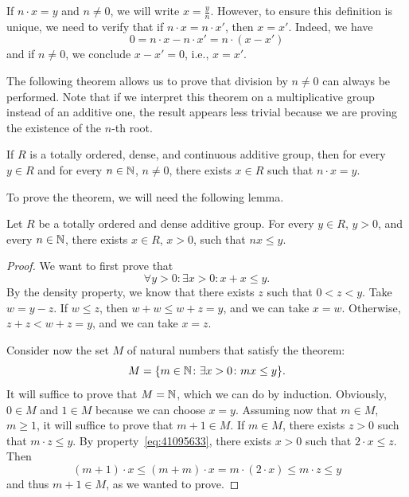 If $n\cdot x = y$ and $n\neq 0$, we will write $x=\frac y n$. However, to ensure
this definition is unique, we need to verify that if $n\cdot x = n\cdot x'$,
then $x=x'$. Indeed, we have
\[
  0 = n\cdot x - n\cdot x' = n\cdot (x-x')
\]
and if $n\neq 0$, we conclude $x-x'=0$, i.e., $x=x'$.

The following theorem allows us to prove that division by $n\neq 0$ can always
be performed. Note that if we interpret this theorem on a multiplicative group
instead of an additive one, the result appears less trivial because we are
proving the existence of the $n$-th root.

\begin{theorem}[Divisibility]
\label{th:divisibile}%
If $R$ is a totally ordered, dense, and continuous additive group, then for
every $y\in R$ and for every $n\in {\mathbb N}$, $n\neq 0$, there exists $x\in R$ such
that $n\cdot x = y$.
\end{theorem}
%
To prove the theorem, we will need the following lemma.
%
\begin{lemma}
  \label{lm:numeri_piccoli}%
Let $R$ be a totally ordered and dense additive group. For every $y\in R$,
$y>0$, and every $n\in {\mathbb N}$, there exists $x\in R$, $x>0$, such that $nx\le y$.
\end{lemma}
%
\begin{proof}
We want to first prove that 
\begin{equation}\label{eq:41095633}
  \forall y>0 \colon \exists x>0 \colon x+x \le y.
\end{equation}
By the density property, we know that there exists $z$ such that $0<z<y$. Take
$w=y-z$. If $w\le z$, then $w+w\le w+z=y$, and we can take $x=w$. Otherwise,
$z+z < w+z = y$, and we can take $x=z$.

Consider now the set $M$ of natural numbers that satisfy the theorem:
\[
  M = {\left\{ m\in {\mathbb N}\colon \exists x>0\colon mx\le y \right\}}.
\]
It will suffice to prove that $M={\mathbb N}$, which we can do by induction. Obviously,
$0\in M$ and $1\in M$ because we can choose $x=y$. Assuming now that $m\in M$,
$m\ge 1$, it will suffice to prove that $m+1\in M$. If $m\in M$, there exists
$z>0$ such that $m\cdot z\le y$. By property~\eqref{eq:41095633}, there exists
$x>0$ such that $2\cdot x\le z$. Then
\[
  (m+1)\cdot x 
  \le (m+m)\cdot x 
  = m\cdot(2\cdot x)
  \le m\cdot z \le y
\]
and thus $m+1\in M$, as we wanted to prove.
\end{proof}
